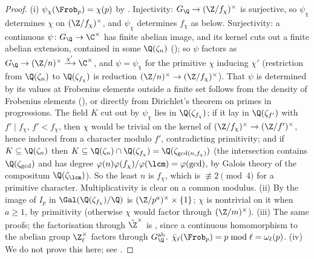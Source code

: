 \begin{proof}
(i) $\psi_\chi(\Frob_p)=\chi(p)$ by . Injectivity: $G_\Q\to(\Z/f_\chi)^\times$ is surjective, so $\psi_\chi$ determines $\chi$
on $(\Z/f_\chi)^\times$, and $\psi_\chi$ determines $f_\chi$ as below. Surjectivity: a continuous $\psi\colon G_\Q\to\C^\times$ has finite abelian image,
and its kernel cuts out a finite abelian extension, contained in some $\Q(\zeta_n)$ (); so $\psi$ factors as
$G_\Q\to(\Z/n)^\times\xrightarrow{\chi'}\C^\times$, and $\psi=\psi_\chi$ for the primitive $\chi$ inducing $\chi'$ (restriction from $\Q(\zeta_n)$ to $\Q(\zeta_{f_\chi})$
is reduction $(\Z/n)^\times\to(\Z/f_\chi)^\times$). That $\psi$ is determined by its values at Frobenius elements outside a finite set follows from the density
of Frobenius elements (), or directly from Dirichlet's theorem on primes in progressions. The field $K$ cut out by $\psi_\chi$ lies
in $\Q(\zeta_{f_\chi})$; if it lay in $\Q(\zeta_{f'})$ with $f'\mid f_\chi$, $f'<f_\chi$, then $\chi$ would be trivial on the kernel of $(\Z/f_\chi)^\times\to(\Z/f')^\times$,
hence induced from a character modulo $f'$, contradicting primitivity; and if $K\subseteq\Q(\zeta_n)$ then $K\subseteq\Q(\zeta_n)\cap\Q(\zeta_{f_\chi})=\Q(\zeta_{\gcd(n,f_\chi)})$
(the intersection contains $\Q(\zeta_{\gcd})$ and has degree $\varphi(n)\varphi(f_\chi)/\varphi(\lcm)=\varphi(\gcd)$, by Galois theory of the compositum
$\Q(\zeta_{\lcm})$). So the least $n$ is $f_\chi$, which is $\not\equiv2\pmod4$ for a primitive character. Multiplicativity is clear on a common modulus.
(ii) By  the image of $I_p$ in $\Gal(\Q(\zeta_{f_\chi})/\Q)$ is $(\Z/p^a)^\times\times\{1\}$; $\chi$ is nontrivial on it when $a\ge1$,
by primitivity (otherwise $\chi$ would factor through $(\Z/m)^\times$). (iii) The same proofs; the factorisation through $\hat\Z^\times$ is
, since a continuous homomorphism to the abelian group $\Z_\ell^\times$ factors through $G_\Q^{\mathrm{ab}}$. $\bar\chi_\ell(\Frob_p)=p\bmod
\ell=\omega_\ell(p)$. (iv) We do not prove this here; see .
\end{proof}

